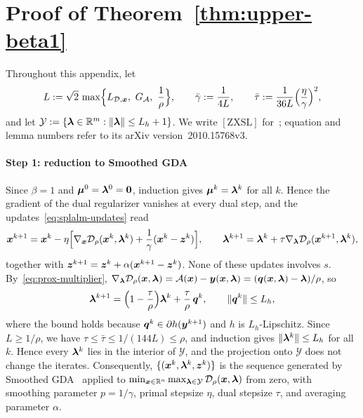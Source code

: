 \section{Proof of Theorem~\ref{thm:upper-beta1}}
\label{app:upper-beta1}

Throughout this appendix, let
\[
L:=\sqrt2\,\max\Bigl\{L_{\calD,\bx},\ G_{\calA},\ \frac1\rho\Bigr\},
\qquad
\bar\gamma:=\frac1{4L},
\qquad
\bar\tau:=\frac1{36L}\Bigl(\frac\eta\gamma\Bigr)^2,
\]
and let \(\mathcal Y:=\{\bm{\lambda}\in\mathbb{R}^m:\|\bm{\lambda}\|\le L_h+1\}\). We write
\([\mathrm{ZXSL}]\) for~\cite{zhang2020smoothed}; equation and lemma numbers
refer to its arXiv version~2010.15768v3.

\paragraph{Step 1: reduction to Smoothed GDA}
Since \(\beta=1\) and \(\bm{\mu}^0=\bm{\lambda}^0=\bm{0}\), induction gives
\(\bm{\mu}^k=\bm{\lambda}^k\) for all \(k\). Hence the gradient of the dual regularizer
vanishes at every dual step, and the updates~\eqref{eq:splalm-updates} read
\[
\bm{x}^{k+1}=\bm{x}^k-\eta\Bigl[\nabla_{\bm{x}}\mathcal{D}_\rho(\bm{x}^k,\bm{\lambda}^k)
  +\frac1\gamma(\bm{x}^k-\bm{z}^k)\Bigr],
\qquad
\bm{\lambda}^{k+1}=\bm{\lambda}^k+\tau\nabla_{\bm{\lambda}}\mathcal{D}_\rho(\bm{x}^{k+1},\bm{\lambda}^k),
\]
together with \(\bm{z}^{k+1}=\bm{z}^k+\alpha(\bm{x}^{k+1}-\bm{z}^k)\). None of these
updates involves \(s\). By~\eqref{eq:prox-multiplier},
\(\nabla_{\bm{\lambda}}\mathcal{D}_\rho(\bm{x},\bm{\lambda})=\mathcal{A}(\bm{x})-\bm{y}(\bm{x},\bm{\lambda})
=(\bm{q}(\bm{x},\bm{\lambda})-\bm{\lambda})/\rho\), so
\[
\bm{\lambda}^{k+1}=\Bigl(1-\frac\tau\rho\Bigr)\bm{\lambda}^k+\frac\tau\rho\,\bm{q}^k,
\qquad \|\bm{q}^k\|\le L_h,
\]
where the bound holds because \(\bm{q}^k\in\partial h(\bm{y}^{k+1})\) and \(h\) is
\(L_h\)-Lipschitz. Since \(L\ge1/\rho\), we have
\(\tau\le\bar\tau\le1/(144L)\le\rho\), and induction gives
\(\|\bm{\lambda}^k\|\le L_h\) for all \(k\). Hence every \(\bm{\lambda}^k\) lies in the
interior of \(\mathcal Y\), and the projection onto \(\mathcal Y\) does not
change the iterates. Consequently, \(\{(\bm{x}^k,\bm{\lambda}^k,\bm{z}^k)\}\) is the
sequence generated by Smoothed GDA~\cite[Algorithm~2]{zhang2020smoothed}
applied to
\(\min_{\bm{x}\in\mathbb{R}^n}\max_{\bm{\lambda}\in\mathcal Y}\mathcal{D}_\rho(\bm{x},\bm{\lambda})\) from
zero, with smoothing parameter \(p=1/\gamma\), primal stepsize \(\eta\), dual
stepsize \(\tau\), and averaging parameter \(\alpha\).

